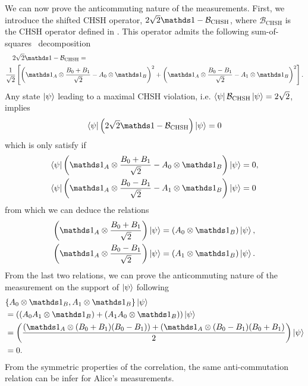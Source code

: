 \medbreak

We can now prove the anticommuting nature of the measurements.
First, we introduce the shifted CHSH operator, $2\sqrt{2}\id-\mathcal{B}_\text{CHSH}$, where $\mathcal{B}_\text{CHSH}$ is the CHSH operator defined in . 
This operator admits the following sum-of-squares~\cite{Pironio2010} decomposition 
\begin{equation}
	\begin{split}
		2&\sqrt{2}\id-\mathcal{B}_\text{CHSH} = \\
		\frac{1}{\sqrt{2}}&\left[ \left(\id_A \otimes \frac{B_0+B_1}{\sqrt{2}} - A_0 \otimes \id_B \right)^2 
		+ \left( \id_A \otimes \frac{ B_0-B_1}{\sqrt{2}} - A_1\otimes \id_B \right)^2 \right].
	\end{split}
\end{equation}
Any state $\ket{\psi}$ leading to a maximal CHSH violation, i.e. $\bra{\psi}\mathcal{B}_\text{CHSH}\ket{\psi}=2\sqrt{2}$, implies
\begin{equation}
	\bra{\psi}\left(2\sqrt{2}\id-\mathcal{B}_\text{CHSH}\right)\ket{\psi} = 0
\end{equation}
which is only satisfy if
\begin{equation}
	\begin{split}
		\bra{\psi} \left(\id_A \otimes \frac{B_0+B_1}{\sqrt{2}} - A_0\otimes \id_B \right)\ket{\psi} &= 0,  \\
		\bra{\psi} \left(\id_A \otimes \frac{B_0-B_1}{\sqrt{2}} - A_1\otimes \id_B \right)\ket{\psi} &= 0 
	\end{split}
\end{equation}
from which we can deduce the relations
\begin{equation}
	\begin{split}
		\left(\id_A \otimes \frac{B_0+B_1}{\sqrt{2}}\right)\ket{\psi} &=  (A_0\otimes \id_B)\ket{\psi}, \\
		\left(\id_A \otimes \frac{B_0-B_1}{\sqrt{2}}\right)\ket{\psi} &=  (A_1\otimes \id_B)\ket{\psi}.
	\end{split}	
	\label{eq:aliceBobMeasEquivalence}
\end{equation}
From the last two relations, we can prove the anticommuting nature of the measurement on the support of $\ket{\psi}$ following
\begin{equation}
	\begin{split}
		&\{A_0 \otimes \id_B,A_1 \otimes \id_B\} \ket{\psi} \\
		& = \left((A_0 A_1 \otimes \id_B)+(A_1 A_0 \otimes \id_B)\right)\ket{\psi}  \\
		& = \left(\frac{(\id_A \otimes (B_0+B_1)(B_0-B_1)) + (\id_A \otimes (B_0-B_1)(B_0+B_1)}{2}\right)\ket{\psi} \\
		& = 0.
	\end{split}
	\label{eq:anticommuting}
\end{equation}
From the symmetric properties of the correlation, the same anti-commutation relation can be infer for Alice's measurements.

